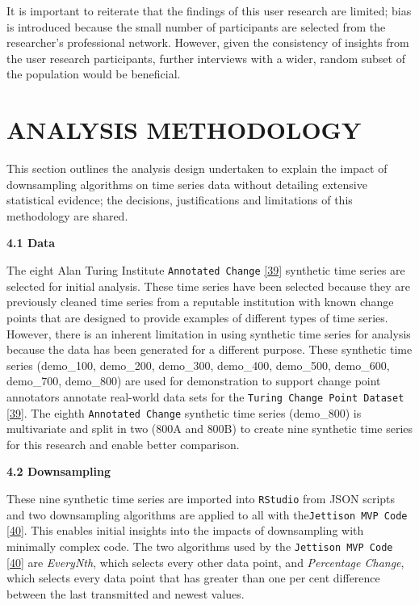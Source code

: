 \documentclass{article}
\begin{document}
It is important to reiterate that the findings of this user research are
limited; bias is introduced because the small number of participants are
selected from the researcher's professional network. However, given the
consistency of insights from the user research participants, further
interviews with a wider, random subset of the population would be
beneficial.

\hypertarget{analysis-methodology}{%
\section{ANALYSIS METHODOLOGY}\label{analysis-methodology}}

This section outlines the analysis design undertaken to explain the
impact of downsampling algorithms on time series data without detailing
extensive statistical evidence; the decisions, justifications and
limitations of this methodology are shared.

\textbf{4.1 Data}

The eight Alan Turing Institute \texttt{Annotated\ Change}
\protect\hyperlink{ref-ATIChangePoint}{{[}39{]}} synthetic time series
are selected for initial analysis. These time series have been selected
because they are previously cleaned time series from a reputable
institution with known change points that are designed to provide
examples of different types of time series. However, there is an
inherent limitation in using synthetic time series for analysis because
the data has been generated for a different purpose. These synthetic
time series (demo\_100, demo\_200, demo\_300, demo\_400, demo\_500,
demo\_600, demo\_700, demo\_800) are used for demonstration to support
change point annotators annotate real-world data sets for the
\texttt{Turing\ Change\ Point\ Dataset}
\protect\hyperlink{ref-ATIChangePoint}{{[}39{]}}. The eighth
\texttt{Annotated\ Change} synthetic time series (demo\_800) is
multivariate and split in two (800A and 800B) to create nine synthetic
time series for this research and enable better comparison.

\textbf{4.2 Downsampling}

These nine synthetic time series are imported into \texttt{RStudio} from
JSON scripts and two downsampling algorithms are applied to all with
the\texttt{Jettison\ MVP\ Code}
\protect\hyperlink{ref-Jettison}{{[}40{]}}. This enables initial
insights into the impacts of downsampling with minimally complex code.
The two algorithms used by the \texttt{Jettison\ MVP\ Code}
\protect\hyperlink{ref-Jettison}{{[}40{]}} are \emph{EveryNth}, which
selects every other data point, and \emph{Percentage Change}, which
selects every data point that has greater than one per cent difference
between the last transmitted and newest values.
\end{document}

